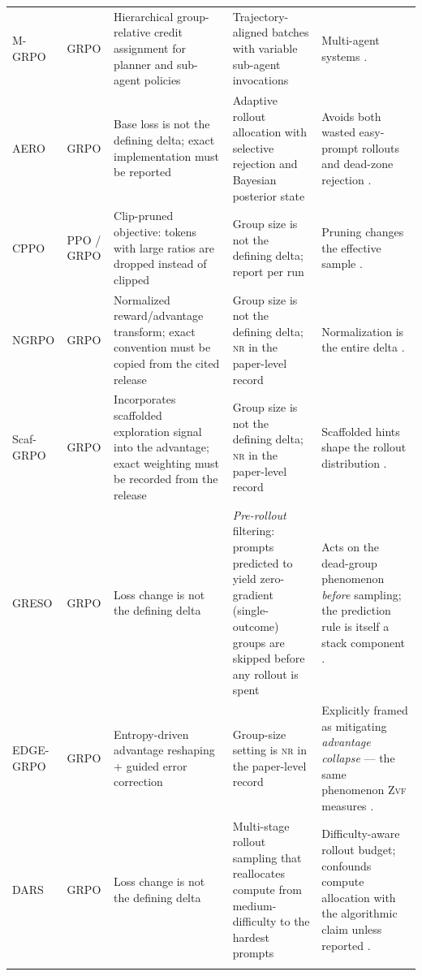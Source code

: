 \documentclass[11pt]{article}
\newcommand{\nr}{\textsc{nr}}
\newcommand{\zvf}{\textsc{Zvf}}
\newcommand{\grpo}{\textsc{GRPO}}
\begin{document}
\begin{longtable}{@{}p{2.1cm}p{2.4cm}p{3.0cm}p{2.0cm}p{3.3cm}@{}}
M-\grpo{} & \grpo{} & Hierarchical group-relative credit assignment for
  planner and sub-agent policies & Trajectory-aligned batches with variable
  sub-agent invocations & Multi-agent systems \cite{hong2025mgrpo}.\\
\addlinespace

AERO & \grpo{} & Base loss is not the defining delta; exact implementation
  must be reported & Adaptive rollout allocation with selective rejection and
  Bayesian posterior state & Avoids both wasted easy-prompt rollouts and
  dead-zone rejection \cite{zhang2026aero}.\\
\addlinespace

CPPO & PPO / \grpo{} & Clip-pruned objective: tokens with large ratios are
  dropped instead of clipped & Group size is not the defining delta; report per
  run & Pruning changes the
  effective sample \cite{lin2025cppo}.\\
\addlinespace

NGRPO & \grpo{} & Normalized reward/advantage transform; exact convention must
  be copied from the cited release & Group size is not the defining delta; \nr{}
  in the paper-level record & Normalization is the entire delta
  \cite{nan2025ngrpo}.\\
\addlinespace

Scaf-\grpo{} & \grpo{} & Incorporates scaffolded exploration signal into the
  advantage; exact weighting must be recorded from the release & Group size is
  not the defining delta; \nr{} in the paper-level record & Scaffolded hints shape
  the rollout distribution \cite{zhang2025scaffgrpo}.\\
\addlinespace

GRESO & \grpo{} & Loss change is not the defining delta & \emph{Pre-rollout} filtering:
  prompts predicted to yield zero-gradient (single-outcome) groups are skipped
  before any rollout is spent & Acts on the dead-group phenomenon \emph{before}
  sampling; the prediction rule is itself a stack component
  \cite{greso2025,agenticrlsurvey2026}.\\
\addlinespace

EDGE-\grpo{} & \grpo{} & Entropy-driven advantage reshaping + guided error
  correction & Group-size setting is \nr{} in the paper-level record & Explicitly framed as mitigating
  \emph{advantage collapse} --- the same phenomenon \zvf{} measures
  \cite{edgegrpo2025,agenticrlsurvey2026}.\\
\addlinespace

DARS & \grpo{} & Loss change is not the defining delta & Multi-stage rollout sampling that
  reallocates compute from medium-difficulty to the hardest prompts &
  Difficulty-aware rollout budget; confounds compute allocation with the
  algorithmic claim unless reported \cite{dars2025,agenticrlsurvey2026}.\\
\addlinespace


\end{longtable}
\end{document}
